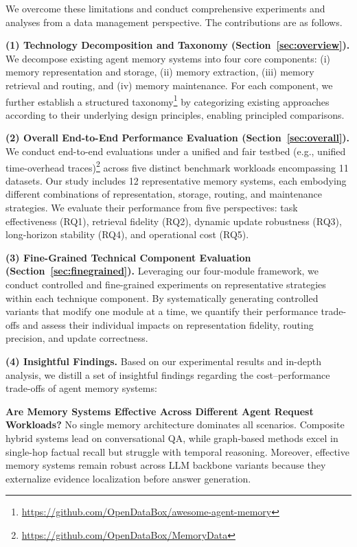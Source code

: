 \documentclass{llmxive}
\providecommand{\llm}{\textsc{LLM}\xspace}
\providecommand{\blue}[1]{#1}
\begin{document}
We overcome these limitations and conduct comprehensive experiments and analyses from a data management perspective. The contributions are as follows.

\noindent
\textbf{(1) Technology Decomposition and Taxonomy (Section~\ref{sec:overview}).}
We decompose existing agent memory systems into four core components: (i) memory representation and storage, (ii) memory extraction, (iii) memory retrieval and routing, and (iv) memory maintenance. For each component, we further establish a structured taxonomy\footnote{\blue{\url{https://github.com/OpenDataBox/awesome-agent-memory}}} by categorizing existing approaches according to their underlying design principles, enabling principled comparisons.

\noindent
\textbf{(2) Overall End-to-End Performance Evaluation (Section~\ref{sec:overall}).}
We conduct end-to-end evaluations under a unified and fair testbed (e.g., {unified time-overhead traces})\footnote{\blue{\url{https://github.com/OpenDataBox/MemoryData}}} across five distinct benchmark workloads encompassing 11 datasets. Our study includes 12 representative memory systems, each embodying different combinations of representation, storage, routing, and maintenance strategies. We evaluate their performance from five perspectives: task effectiveness (RQ1), retrieval fidelity (RQ2), dynamic update robustness (RQ3), long-horizon stability (RQ4), and operational cost (RQ5).

\noindent
\textbf{(3) Fine-Grained Technical Component Evaluation (Section~\ref{sec:finegrained}).}
Leveraging our four-module framework, we conduct controlled and fine-grained experiments on representative strategies within each technique component. By systematically generating controlled variants that modify one module at a time, we quantify their performance trade-offs and assess their individual impacts on representation fidelity, routing precision, and update correctness.

\noindent
\textbf{(4) Insightful Findings.}
Based on our experimental results and in-depth analysis, we distill a set of insightful findings regarding the cost--performance trade-offs of agent memory systems:

\noindent
 \textbf{Are Memory Systems Effective Across Different Agent Request Workloads?} No single memory architecture dominates all scenarios. Composite hybrid systems lead on conversational QA, while graph-based methods excel in single-hop factual recall but struggle with temporal reasoning. Moreover, effective memory systems remain robust across \llm backbone variants because they externalize evidence localization before answer generation.
\end{document}
